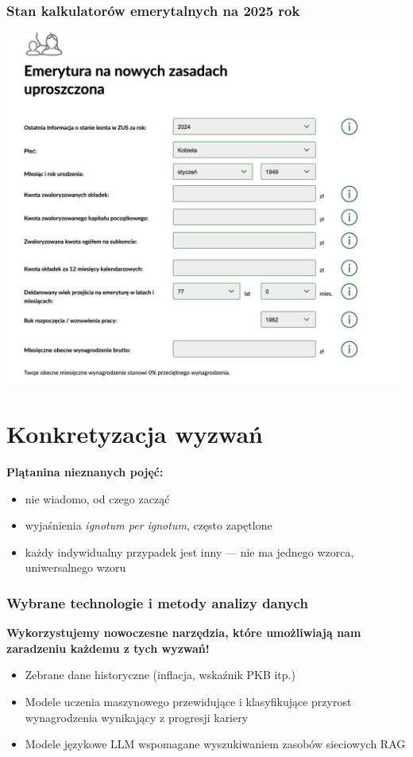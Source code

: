 \documentclass{beamer}
\begin{document}
\begin{frame}
\frametitle{Stan kalkulatorów emerytalnych na 2025 rok}
\includegraphics[width=.8\textwidth]{img/zus_calculator_03}
\end{frame}

\section{Konkretyzacja wyzwań}

\begin{frame}
\textbf{Plątanina nieznanych pojęć:}
    \pause
\begin{itemize}
    \item nie wiadomo, od czego zacząć
    \pause
    \item wyjaśnienia \emph{ignotum per ignotum}, często zapętlone
    \pause
    \item każdy indywidualny przypadek jest inny --- nie ma jednego wzorca, uniwersalnego wzoru
\end{itemize}
\end{frame}

\begin{frame}
\frametitle{Wybrane technologie i metody analizy danych}
\textbf{Wykorzystujemy nowoczesne narzędzia, które umożliwiają nam zaradzeniu każdemu z tych wyzwań!}
    \pause
\begin{itemize}
    \item Zebrane dane historyczne (inflacja, wskaźnik PKB itp.)
    \pause
    \item Modele uczenia maszynowego przewidujące i klasyfikujące przyrost wynagrodzenia wynikający z progresji kariery
    \pause
    \item Modele językowe LLM wspomagane wyszukiwaniem zasobów sieciowych RAG
\end{itemize}
\end{frame}
\end{document}
